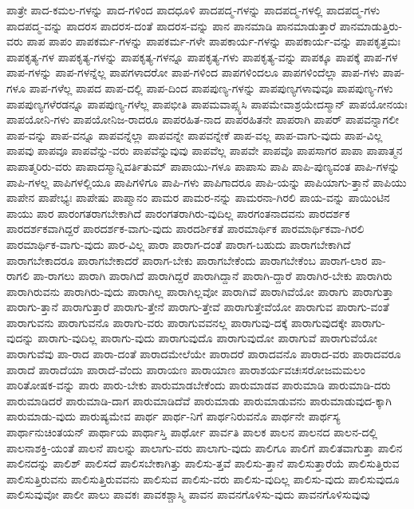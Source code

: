{ಪಾತ್ರೇ
ಪಾದ-ಕಮಲ-ಗಳನ್ನು
ಪಾದ-ಗಳಿಂದ
ಪಾದಧೂಳಿ
ಪಾದಪದ್ಮ-ಗಳನ್ನು
ಪಾದಪದ್ಮ-ಗಳಲ್ಲಿ
ಪಾದಪದ್ಮ-ಗಳು
ಪಾದಪದ್ಮ-ವನ್ನು
ಪಾದರಸ
ಪಾದರಸ-ದಂತೆ
ಪಾದರಸ-ವನ್ನು
ಪಾನ
ಪಾನಮಾಡಿ
ಪಾನಮಾಡುತ್ತಾರೆ
ಪಾನಮಾಡುತ್ತಿರು-ವರು
ಪಾಪ
ಪಾಪಂ
ಪಾಪಕರ್ಮ-ಗಳನ್ನು
ಪಾಪಕರ್ಮ-ಗಳೇ
ಪಾಪಕಾರ್ಯ-ಗಳನ್ನು
ಪಾಪಕಾರ್ಯ-ವನ್ನು
ಪಾಪಕೃತ್ತಮಃ
ಪಾಪಕೃತ್ಯ-ಗಳ
ಪಾಪಕೃತ್ಯ-ಗಳನ್ನು
ಪಾಪಕೃತ್ಯ-ಗಳನ್ನೂ
ಪಾಪಕೃತ್ಯ-ಗಳು
ಪಾಪಕೃತ್ಯ-ವನ್ನು
ಪಾಪಕ್ಕೂ
ಪಾಪಕ್ಕೆ
ಪಾಪ-ಗಳ
ಪಾಪ-ಗಳನ್ನು
ಪಾಪ-ಗಳನ್ನೆಲ್ಲ
ಪಾಪಗಳಾದರೋ
ಪಾಪ-ಗಳಿಂದ
ಪಾಪಗಳಿಂದಲೂ
ಪಾಪಗಳಿಂದೆಲ್ಲಾ
ಪಾಪ-ಗಳು
ಪಾಪ-ಗಳೂ
ಪಾಪ-ಗಳೆಲ್ಲ
ಪಾಪದ
ಪಾಪ-ದಲ್ಲಿ
ಪಾಪ-ದಿಂದ
ಪಾಪಪುಣ್ಯ-ಗಳನ್ನು
ಪಾಪಪುಣ್ಯಗಳಾವುವೂ
ಪಾಪಪುಣ್ಯ-ಗಳು
ಪಾಪಪುಣ್ಯಗಳೆರಡನ್ನೂ
ಪಾಪಪುಣ್ಯ-ಗಳೆಲ್ಲ
ಪಾಪಭೀತಿ
ಪಾಪಮವಾಪ್ಸ್ಯಸಿ
ಪಾಪಮೇವಾಶ್ರಯೇದಸ್ಮಾನ್
ಪಾಪಯೋನಯಃ
ಪಾಪಯೋನಿ-ಗಳು
ಪಾಪಯೋನಿಜ-ರಾದರೂ
ಪಾಪರಹಿತ-ನಾದ
ಪಾಪರಹಿತನೇ
ಪಾಪರಾಗಿ
ಪಾಪರ್
ಪಾಪವನ್ನಾಗಲೀ
ಪಾಪ-ವನ್ನು
ಪಾಪ-ವನ್ನೂ
ಪಾಪವನ್ನೆಲ್ಲಾ
ಪಾಪವನ್ನೇ
ಪಾಪವನ್ನೇಕೆ
ಪಾಪ-ವಲ್ಲ
ಪಾಪ-ವಾಗು-ವುದು
ಪಾಪ-ವಿಲ್ಲ
ಪಾಪವು
ಪಾಪವೂ
ಪಾಪವೆನ್ನು-ವರು
ಪಾಪವೆನ್ನುವುವು
ಪಾಪವೆಲ್ಲ
ಪಾಪವೇ
ಪಾಪವೊ
ಪಾಪಸಾಗರ
ಪಾಪಾ
ಪಾಪಾತ್ಮನ
ಪಾಪಾತ್ಮರಿರು-ವರು
ಪಾಪಾದಸ್ಮಾನ್ನಿವರ್ತಿತುಮ್
ಪಾಪಾಯು-ಗಳೂ
ಪಾಪಾಸು
ಪಾಪಿ
ಪಾಪಿ-ಪುಣ್ಯವಂತ
ಪಾಪಿ-ಗಳನ್ನು
ಪಾಪಿ-ಗಳಲ್ಲ
ಪಾಪಿಗಳಲ್ಲಿಯೂ
ಪಾಪಿಗಳಿಗೂ
ಪಾಪಿ-ಗಳು
ಪಾಪಿಗಾದರೂ
ಪಾಪಿ-ಯನ್ನು
ಪಾಪಿಯಾಗು-ತ್ತಾನೆ
ಪಾಪಿಯು
ಪಾಪೇನ
ಪಾಪೇಭ್ಯಃ
ಪಾಪೇಷು
ಪಾಪ್ಮಾನಂ
ಪಾಮರ
ಪಾಮರ-ನನ್ನು
ಪಾಮರನಾ-ಗಿರಲಿ
ಪಾಯ-ವನ್ನು
ಪಾಯಿಂಟಿನ
ಪಾಯು
ಪಾರ
ಪಾರಂಗತರಾಗಬೇಕಾಗಿದೆ
ಪಾರಂಗತರಾಗಿರು-ವುದಿಲ್ಲ
ಪಾರಗಂತನಾದವನು
ಪಾರದರ್ಶಕ
ಪಾರದರ್ಶಕವಾಗಿದ್ದರೆ
ಪಾರದರ್ಶಕ-ವಾಗು-ವುದು
ಪಾರದರ್ಶಿಕತೆ
ಪಾರಮಾರ್ಥಿಕ
ಪಾರಮಾರ್ಥಿಕವಾ-ಗಿರಲಿ
ಪಾರಮಾರ್ಥಿಕ-ವಾಗು-ವುದು
ಪಾರ-ವಿಲ್ಲ
ಪಾರಾ
ಪಾರಾಗ-ದಂತೆ
ಪಾರಾಗ-ಬಹುದು
ಪಾರಾಗಬೇಕಾಗಿದೆ
ಪಾರಾಗಬೇಕಾದರೂ
ಪಾರಾಗಬೇಕಾದರೆ
ಪಾರಾಗ-ಬೇಕು
ಪಾರಾಗಬೇಕೆಂದು
ಪಾರಾಗಬೇಕೆಂಬ
ಪಾರಾಗ-ಲಾರ
ಪಾ-ರಾಗಲಿ
ಪಾ-ರಾಗಲು
ಪಾರಾಗಿ
ಪಾರಾಗಿದೆ
ಪಾರಾಗಿದ್ದರೆ
ಪಾರಾಗಿದ್ದಾನೆ
ಪಾರಾಗಿ-ದ್ದಾರೆ
ಪಾರಾಗಿರ-ಬೇಕು
ಪಾರಾಗಿರು
ಪಾರಾಗಿರುವನು
ಪಾರಾಗಿರು-ವುದು
ಪಾರಾಗಿಲ್ಲ
ಪಾರಾಗಿಲ್ಲವೋ
ಪಾರಾಗಿವೆ
ಪಾರಾಗಿವೆಯೋ
ಪಾರಾಗು
ಪಾರಾಗುತ್ತಾ
ಪಾರಾಗು-ತ್ತಾನೆ
ಪಾರಾಗುತ್ತಾರೆ
ಪಾರಾಗು-ತ್ತೇನೆ
ಪಾರಾಗು-ತ್ತೇವೆ
ಪಾರಾಗುತ್ತೇವೆಯೋ
ಪಾರಾಗುವ
ಪಾರಾಗು-ವಂತೆ
ಪಾರಾಗುವನು
ಪಾರಾಗುವನೊ
ಪಾರಾಗು-ವರು
ಪಾರಾಗುವವನಲ್ಲ
ಪಾರಾಗುವು-ದಕ್ಕೆ
ಪಾರಾಗುವುದಕ್ಕೇ
ಪಾರಾಗು-ವುದನ್ನು
ಪಾರಾಗು-ವುದಿಲ್ಲ
ಪಾರಾಗು-ವುದು
ಪಾರಾಗುವುದೊ
ಪಾರಾಗುವುದೋ
ಪಾರಾಗುವೆ
ಪಾರಾಗುವೆಯೋ
ಪಾರಾಗುವೆವು
ಪಾ-ರಾದ
ಪಾರಾ-ದಂತೆ
ಪಾರಾದಮೇಲೆಯೇ
ಪಾರಾದರೆ
ಪಾರಾದವನೊ
ಪಾರಾದ-ವರು
ಪಾರಾದವರೂ
ಪಾರಾದೆ
ಪಾರಾದೆಯಾ
ಪಾರಾದೆ-ವೆಂದು
ಪಾರಾಯಣ
ಪಾರಾಯಾಣ
ಪಾರಾಶರ್ಯವಚಃಸರೋಜಮಮಲಂ
ಪಾರಿತೋಷಕ-ವನ್ನು
ಪಾರು
ಪಾರು-ಬೇಕು
ಪಾರುಮಾಡಬೇಕೆಂದು
ಪಾರುಮಾಡವ
ಪಾರುಮಾಡಿ
ಪಾರುಮಾಡಿ-ದರು
ಪಾರುಮಾಡಿದರೆ
ಪಾರುಮಾಡಿ-ದಾಗ
ಪಾರುಮಾಡಿದೆವೆ
ಪಾರುಮಾಡು
ಪಾರುಮಾಡುವನು
ಪಾರುಮಾಡುವುದ-ಕ್ಕಾಗಿ
ಪಾರುಮಾಡು-ವುದು
ಪಾರುಷ್ಯಮೇವ
ಪಾರ್ಥ
ಪಾರ್ಥ-ನಿಗೆ
ಪಾರ್ಥನಿರುವನೊ
ಪಾರ್ಥನೇ
ಪಾರ್ಥಸ್ಯ
ಪಾರ್ಥಾನುಚಿಂತಯನ್
ಪಾರ್ಥಾಯ
ಪಾರ್ಥಾಸ್ತಿ
ಪಾರ್ಥೋ
ಪಾರ್ವತಿ
ಪಾಲಕ
ಪಾಲನ
ಪಾಲನದ
ಪಾಲನ-ದಲ್ಲಿ
ಪಾಲನಾಶಕ್ತಿ-ಯಂತೆ
ಪಾಲನೆ
ಪಾಲನ್ನು
ಪಾಲಾಗು-ವರು
ಪಾಲಾಗು-ವುದು
ಪಾಲಿಗೂ
ಪಾಲಿಗೆ
ಪಾಲಿತವಾಗುತ್ತಾ
ಪಾಲಿನ
ಪಾಲಿನದನ್ನು
ಪಾಲಿಶ್
ಪಾಲಿಸದೆ
ಪಾಲಿಸಬೇಕಾಗಿತ್ತು
ಪಾಲಿಸು-ತ್ತವೆ
ಪಾಲಿಸು-ತ್ತಾನೆ
ಪಾಲಿಸುತ್ತಾರೆಯೆ
ಪಾಲಿಸುತ್ತಿರುವ
ಪಾಲಿಸುತ್ತಿರುವನು
ಪಾಲಿಸುತ್ತಿರುವವನು
ಪಾಲಿಸುವ
ಪಾಲಿಸು-ವರು
ಪಾಲಿಸು-ವುದಿಲ್ಲ
ಪಾಲಿಸು-ವುದು
ಪಾಲಿಸುವುದೂ
ಪಾಲಿಸುವುವೋ
ಪಾಲೀ
ಪಾಲು
ಪಾವಕಃ
ಪಾವಕಶ್ಚಾಸ್ಮಿ
ಪಾವನ
ಪಾವನಗೊಳಿಸು-ವುದು
ಪಾವನಗೊಳಿಸುವುವು
}
